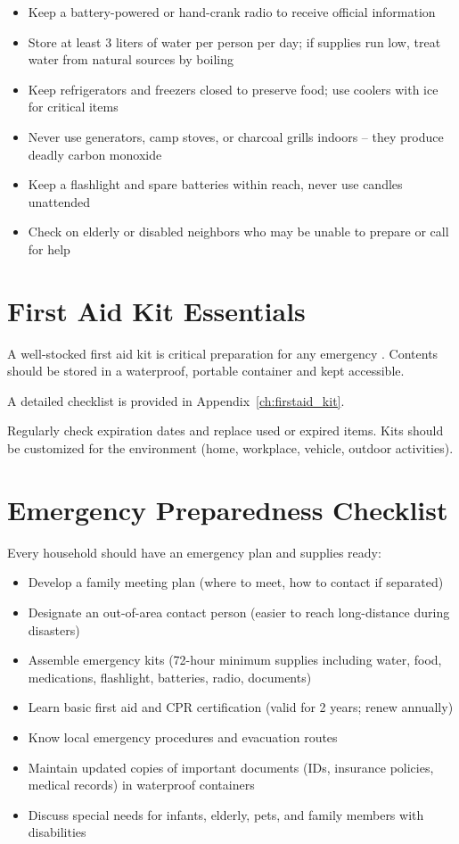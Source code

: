 \begin{itemize}
  \item Keep a battery-powered or hand-crank radio to receive official information
  \item Store at least 3 liters of water per person per day; if supplies run low, treat water from natural sources by boiling
  \item Keep refrigerators and freezers closed to preserve food; use coolers with ice for critical items
  \item Never use generators, camp stoves, or charcoal grills indoors -- they produce deadly carbon monoxide
  \item Keep a flashlight and spare batteries within reach, never use candles unattended
  \item Check on elderly or disabled neighbors who may be unable to prepare or call for help
\end{itemize}

\section{First Aid Kit Essentials}

A well-stocked first aid kit is critical preparation for any emergency \cite{cdc,arc_2020}. Contents should be stored in a waterproof, portable container and kept accessible.

A detailed checklist is provided in Appendix~\ref{ch:firstaid_kit}.

Regularly check expiration dates and replace used or expired items. Kits should be customized for the environment (home, workplace, vehicle, outdoor activities).

\section{Emergency Preparedness Checklist}

Every household should have an emergency plan and supplies ready:

\begin{itemize}
  \item Develop a family meeting plan (where to meet, how to contact if separated)
  \item Designate an out-of-area contact person (easier to reach long-distance during disasters)
  \item Assemble emergency kits (72-hour minimum supplies including water, food, medications, flashlight, batteries, radio, documents)
  \item Learn basic first aid and CPR certification (valid for 2 years; renew annually)
  \item Know local emergency procedures and evacuation routes
  \item Maintain updated copies of important documents (IDs, insurance policies, medical records) in waterproof containers
  \item Discuss special needs for infants, elderly, pets, and family members with disabilities
\end{itemize}

